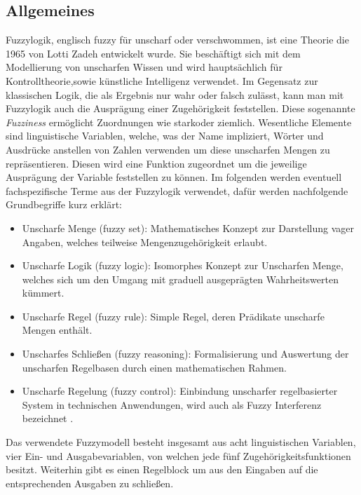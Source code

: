 \subsection{Allgemeines}
Fuzzylogik, englisch fuzzy für unscharf oder verschwommen, ist eine Theorie die 1965 von Lotti Zadeh entwickelt wurde. Sie beschäftigt sich mit dem Modellierung von unscharfen Wissen und wird hauptsächlich für Kontrolltheorie,sowie künstliche Intelligenz verwendet. Im Gegensatz zur klassischen Logik, die als Ergebnis nur wahr oder falsch zulässt, kann man mit Fuzzylogik auch die Ausprägung einer Zugehörigkeit feststellen. Diese sogenannte \textit{Fuzziness} ermöglicht Zuordnungen wie \grqq stark\grqq \space oder \grqq ziemlich\grqq. Wesentliche Elemente sind linguistische Variablen, welche, was der Name impliziert, Wörter und Ausdrücke anstellen von Zahlen verwenden um diese unscharfen Mengen zu repräsentieren. Diesen wird eine Funktion zugeordnet um die jeweilige Ausprägung der Variable feststellen zu können.\cite{fuzzylogik} \newline
Im folgenden werden eventuell fachspezifische Terme aus der Fuzzylogik verwendet, dafür werden nachfolgende Grundbegriffe kurz erklärt:
\begin{itemize}
	\item Unscharfe Menge (fuzzy set): Mathematisches Konzept zur Darstellung vager Angaben, welches teilweise Mengenzugehörigkeit erlaubt.
	\item Unscharfe Logik (fuzzy logic): Isomorphes Konzept zur Unscharfen Menge, welches sich um den Umgang mit graduell ausgeprägten Wahrheitswerten kümmert.
	\item Unscharfe Regel (fuzzy rule): Simple Regel, deren Prädikate unscharfe Mengen enthält.
	\item Unscharfes Schließen (fuzzy reasoning): Formalisierung und Auswertung der unscharfen Regelbasen durch einen mathematischen Rahmen.
	\item Unscharfe Regelung (fuzzy control): Einbindung unscharfer regelbasierter System in technischen Anwendungen, wird auch als Fuzzy Interferenz bezeichnet \cite{fuzzybook}\cite{WissensbasierteSysteme}. 
\end{itemize}
Das verwendete Fuzzymodell besteht insgesamt aus acht linguistischen Variablen, vier Ein- und Ausgabevariablen, von welchen jede fünf Zugehörigkeitsfunktionen besitzt. Weiterhin gibt es einen Regelblock um aus den Eingaben auf die entsprechenden Ausgaben zu schließen.

